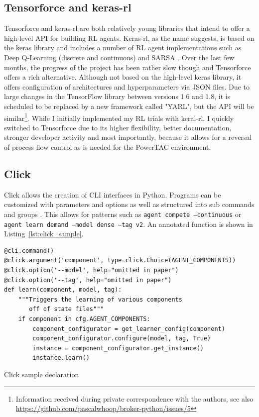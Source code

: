 \subsection{Tensorforce and keras-rl}%
\label{sub:tensorforce_and_keras_rl}

Tensorforce and keras-rl are both relatively young libraries that intend to offer a high-level \ac{API} for building
\ac{RL} agents. Keras-rl, as the name suggests, is based on the keras library and includes a number of \ac{RL} agent
implementations such as Deep Q-Learning (discrete and continuous) and \ac{SARSA} \cite[]{plappert2016kerasrl}. Over the
last few months, the progress of the project has been rather slow though and Tensorforce offers a rich alternative.
Although not based on the high-level keras library, it offers configuration of architectures and hyperparameters via
\ac{JSON} files. Due to large changes in the TensorFlow library between versions 1.6 and 1.8, it is scheduled to be
replaced by a new framework called "YARL", but the \ac{API} will be similar\footnote{Information received during private
    correspondence with the authors, see also
\url{https://github.com/pascalwhoop/broker-python/issues/5}}. While I initially implemented my \ac{RL} trials with
keral-rl, I quickly switched to Tensorforce due to its higher flexibility, better documentation, stronger developer
activity and most importantly, because it allows for a reversal of process flow control as is needed for the
\ac{PowerTAC} environment. 

\subsection{Click}%
\label{sub:click}

Click allows the creation of CLI interfaces in Python. Programs can be customized with parameters and options as well
as structured into sub commands and groups \citep{clickcli}. This allows for patterns such as \texttt{agent compete
--continuous} or \texttt{agent learn demand --model dense --tag v2}. An annotated function is shown in
Listing~\ref{lst:click_sample}.

\begin{listing}[h]
    \begin{verbatim}
@cli.command()
@click.argument('component', type=click.Choice(AGENT_COMPONENTS))
@click.option('--model', help="omitted in paper")
@click.option('--tag', help="omitted in paper")
def learn(component, model, tag):
    """Triggers the learning of various components
       off of state files"""
    if component in cfg.AGENT_COMPONENTS:
        component_configurator = get_learner_config(component)
        component_configurator.configure(model, tag, True)
        instance = component_configurator.get_instance()
        instance.learn()
    \end{verbatim}
    \caption{Click sample declaration}
    \label{lst:click_sample}
\end{listing}

